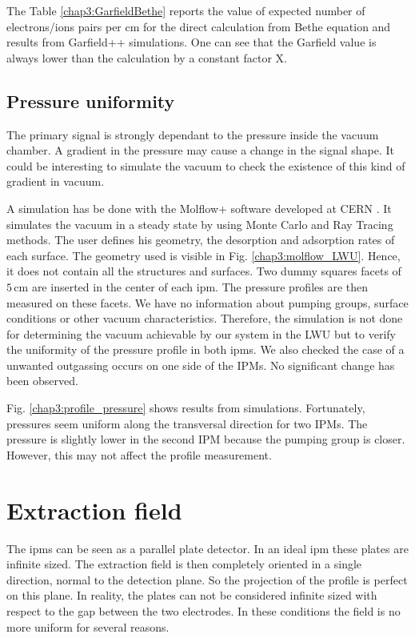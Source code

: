 \begin{refsection}
	The Table \ref{chap3:GarfieldBethe} reports the value of expected number of electrons/ions pairs per cm for the direct calculation from Bethe equation and results from Garfield++ simulations. One can see that the Garfield value is always lower than the calculation by a constant factor X.


	\subsection{Pressure uniformity}

	The primary signal is strongly dependant to the pressure inside the vacuum chamber. A gradient in the pressure may cause a change in the signal shape. It could be interesting to simulate the vacuum to check the existence of this kind of gradient in vacuum.

	

	A simulation has be done with the Molflow+ software developed at CERN \cite{Kersevan2009}. It simulates the vacuum in a steady state by using Monte Carlo and Ray Tracing methods. The user defines his geometry, the desorption and adsorption rates of each surface. The geometry used is visible in Fig. \ref{chap3:molflow_LWU}. Hence, it does not contain all the structures and surfaces. Two dummy squares facets of $5\,\mathrm{cm}$ are inserted in the center of each \acrshort{ipm}. The pressure profiles are then measured on these facets. We have no information about pumping groups, surface conditions or other vacuum characteristics. Therefore, the simulation is not done for determining the vacuum achievable by our system in the LWU but to verify the uniformity of the pressure profile in both \acrshort{ipm}s. We also checked the case of a unwanted outgassing occurs on one side of the IPMs. No significant change has been observed.

	

	Fig. \ref{chap3:profile_pressure} shows results from simulations. Fortunately, pressures seem uniform along the transversal direction for two IPMs. The pressure is slightly lower in the second IPM because the pumping group is closer. However, this may not affect the profile measurement.

	\section{Extraction field}
	
	The \acrshort{ipm}s can be seen as a parallel plate detector. In an ideal \acrshort{ipm} these plates are infinite sized. The extraction field is then completely oriented in a single direction, normal to the detection plane. So the projection of the profile is perfect on this plane. In reality, the plates can not be considered infinite sized with respect to the gap between the two electrodes. In these conditions the field is no more uniform for several reasons.


\end{refsection}
